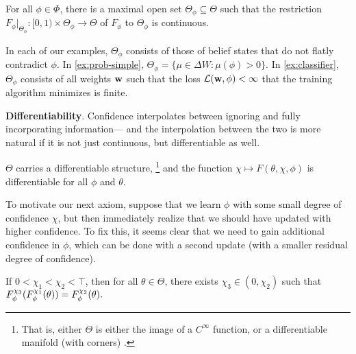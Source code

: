 \begin{prop}
	For all $\phi \in \Phi$,
	there is a maximal open set $\Theta_\phi \subseteq \Theta$ such that
	the restriction $F_{\phi} |_{\Theta_\phi} : [0,1) \times \Theta_\phi \to \Theta$
	of $F_\phi$ to $\Theta_\phi$ is continuous. 	
\end{prop}
In each of our examples, $\Theta_\phi$ consists of those
of belief states that do not flatly contradict $\phi$.
In \cref{ex:prob-simple}, $\Theta_\phi = \{ \mu \in \Delta W : \mu(\phi) > 0\}$.
In \cref{ex:classifier}, $\Theta_\phi$ consists of all weights $\mathbf{w}$ 
such that
the loss $\mathcal L(\mathbf{w}, \phi) < \infty$ that the training algorithm minimizes is finite.



\textbf{Differentiability}.
Confidence interpolates between ignoring and fully incorporating information---
and the interpolation between the two is more natural if it is not just 
continuous, but differentiable as well.

\begin{CFaxioms}
	\item \label{ax:diffble}
	$\Theta$
	carries a differentiable structure,
	\unskip\footnote{
		That is, either 
		$\Theta$ is either the image of a $C^\infty$ function,
	 	or a differentiable manifold (with corners) 
		\parencite{lee2013smooth,joyce2009manifolds-w/corners}.}
	and  
	the function $\chi \mapsto F(\theta,\chi,\phi)$
	is differentiable
	for all $\phi$ and $\theta$.
\end{CFaxioms}

To motivate our next axiom,
suppose that we learn $\phi$ with some small degree of confidence $\chi$,
but then immediately realize that we should have updated with higher confidence. 
To fix this, it seems clear that we need to gain additional confidence
in $\phi$, which can be done with a second update 
(with a smaller residual degree of confidence).

\begin{CFaxioms}
	\item 
	If $0 < \chi_1 < \chi_2 < \top$, 
	then for all $\theta \in \Theta$, 
	there exists 
	$\chi_3 \in (0,\chi_2)$
	such that
	$
	F_\phi^{
	\chi_{3}
	}(F_\phi^{\chi_1}(\theta)) = F_\phi^{\chi_2}(\theta).
	$
	\label{ax:seq-for-more}
\end{CFaxioms}

